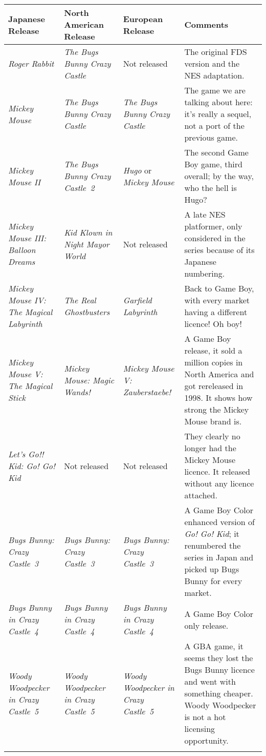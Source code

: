 \documentclass{book}
\let\oldcenter\center
\let\oldendcenter\endcenter
\renewenvironment{center}{\setlength\topsep{0pt}\oldcenter}{\oldendcenter}
\begin{document}
\begin{center} \footnotesize\begin{tabulary}{\textwidth}{LLLL} \hline
\textbf{Japanese Release} & \textbf{North American Release} & \textbf{European Release} & \textbf{Comments} \\
\hline
\emph{Roger Rabbit} & \emph{The Bugs Bunny Crazy Castle} & Not released & The original FDS version and the NES adaptation. \\
\hline
\emph{Mickey Mouse} & \emph{The Bugs Bunny Crazy Castle} & \emph{The Bugs Bunny Crazy Castle} & The game we are talking about here: it’s really a sequel, not a port of the previous game. \\
\hline
\emph{Mickey Mouse II} & \emph{The Bugs Bunny Crazy Castle 2} & \emph{Hugo} or \emph{Mickey Mouse} & The second Game Boy game, third overall; by the way, who the hell is Hugo? \\
\hline
\emph{Mickey Mouse III: Balloon Dreams} & \emph{Kid Klown in Night Mayor World} & Not released & A late NES platformer, only considered in the series because of its Japanese numbering. \\
\hline
\emph{Mickey Mouse IV: The Magical Labyrinth} & \emph{The Real Ghostbusters} & \emph{Garfield Labyrinth} & Back to Game Boy, with every market having a different licence! Oh boy! \\
\hline
\emph{Mickey Mouse V: The Magical Stick} & \emph{Mickey Mouse: Magic Wands!} & \emph{Mickey Mouse V: Zauberstaebe!} & A Game Boy release, it sold a million copies in North America and got rereleased in 1998. It shows how strong the Mickey Mouse brand is. \\
\hline
\emph{Let’s Go!! Kid: Go! Go! Kid} & Not released & Not released & They clearly no longer had the Mickey Mouse licence. It released without any licence attached. \\
\hline
\emph{Bugs Bunny: Crazy Castle 3} & \emph{Bugs Bunny: Crazy Castle 3} & \emph{Bugs Bunny: Crazy Castle 3} & A Game Boy Color enhanced version of \emph{Go! Go! Kid}; it renumbered the series in Japan and picked up Bugs Bunny for every market. \\
\hline
\emph{Bugs Bunny in Crazy Castle 4} & \emph{Bugs Bunny in Crazy Castle 4} & \emph{Bugs Bunny in Crazy Castle 4} & A Game Boy Color only release. \\
\hline
\emph{Woody Woodpecker in Crazy Castle 5} & \emph{Woody Woodpecker in Crazy Castle 5} & \emph{Woody Woodpecker in Crazy Castle 5} & A GBA game, it seems they lost the Bugs Bunny licence and went with something cheaper. Woody Woodpecker is not a hot licensing opportunity. \\
\hline \normalsize\end{tabulary} \end{center}
\end{document}
